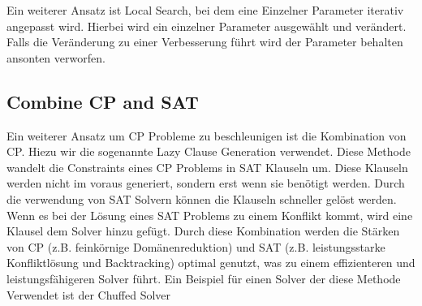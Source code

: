 Ein weiterer Ansatz ist Local Search, bei dem eine Einzelner Parameter iterativ
angepasst wird. Hierbei wird ein einzelner Parameter ausgewählt und verändert.
Falls die Veränderung zu einer Verbesserung führt wird der Parameter behalten
ansonten verworfen.



  
\subsection{Combine CP and SAT}
\label{sec:Combine CP and SAT}
Ein weiterer Ansatz um CP Probleme zu beschleunigen ist die Kombination von CP. 
Hiezu wir die sogenannte Lazy Clause Generation verwendet. Diese Methode wandelt
die Constraints eines CP Problems in SAT Klauseln um. Diese Klauseln werden
nicht im voraus generiert, sondern erst wenn sie benötigt werden. Durch die
verwendung von SAT Solvern können die Klauseln schneller gelöst werden. Wenn es
bei der Lösung eines SAT Problems zu einem Konflikt kommt, wird eine Klausel dem
Solver hinzu gefügt. Durch diese Kombination werden die Stärken von CP (z.B.
feinkörnige Domänenreduktion) und SAT (z.B. leistungsstarke Konfliktlösung und
Backtracking) optimal genutzt, was zu einem effizienteren und leistungsfähigeren
Solver führt. \cite[5]{goosjo} Ein Beispiel für einen Solver der diese Methode
Verwendet ist der Chuffed Solver \cite{Chuff24co}


  

  

